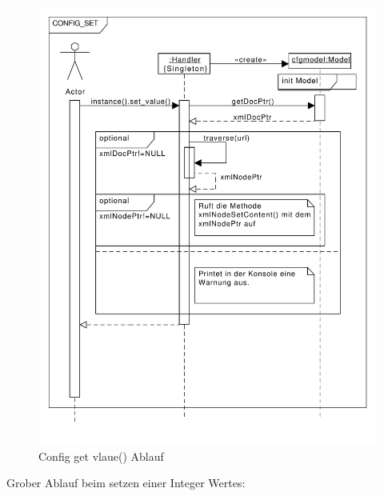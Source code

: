 \begin{figure}[htb!]
	\centering
  	\includegraphics[scale=0.5]{configset.pdf}
	\caption{Config get vlaue() Ablauf}
	\label{c_configget}
\end{figure}



Grober Ablauf beim setzen einer Integer Wertes:



